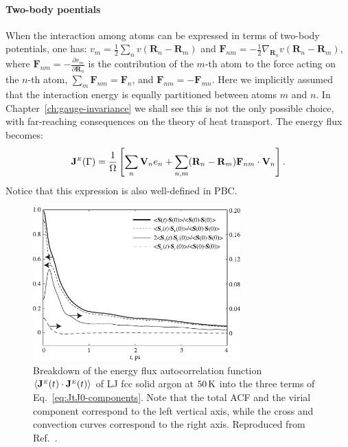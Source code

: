 \begin{LEtext}
\paragraph{Two-body poentials}
When the interaction among atoms can be expressed in terms of two-body potentials, one has: $v_m=\frac{1}{2}\sum_n v(\mathbf{R}_n- \mathbf{R}_m)$ and $\mathbf{F}_{n m} = - \frac{1}{2} \nabla_{\mathbf{R}_n} v(\mathbf{R}_n- \mathbf{R}_m)$, where $\mathbf{F}_{n m} = - \frac{\partial v_m}{\partial \mathbf{R}_n}$ is the contribution of the $m$-th atom to the force acting on the $n$-th atom, $\sum_m \mathbf{F}_{n m} = \mathbf{F}_{n}$, and $\mathbf{F}_{n m} = -\mathbf{F}_{m n}$. 
Here we implicitly assumed that the interaction energy is equally partitioned between atoms $m$ and $n$. In Chapter~\ref{ch:gauge-invariance} we shall see this is not the only possible choice, with far-reaching consequences on the theory of heat transport.
The energy flux becomes:
\begin{equation}
    \mathbf{J}^\smallE(\rGamma) =
       \frac{1}{\rOmega} \left[ \sum_n \mathbf{V}_n e_n + \sum_{n,m} (\mathbf{R}_n-\mathbf{R}_m) \mathbf{F}_{n m} \cdot \mathbf{V}_n \right]. \label{eq:J-classical-2body}
\end{equation}
Notice that this expression is also well-defined in PBC.

\begin{figure}[tb]
    \centering
    \includegraphics[width=8cm]{chapters/chapter2/figures/McGaughey-argon-contributions.pdf}
    \caption{Breakdown of the energy flux autocorrelation function $\langle\mathbf{J}^{\scriptscriptstyle E}(t)\cdot\mathbf{J}^{\scriptscriptstyle E}(t)\rangle$ of LJ fcc solid argon at $50\,\mathrm{K}$ into the three terms of Eq.~\eqref{eq:JtJ0-components}. Note that the total ACF and the virial component correspond to the left vertical axis, while the cross and convection curves correspond to the right axis. Reproduced from Ref.~\cite{McGaughey2006}.}
    \label{fig:argon-convective}
\end{figure}


\end{LEtext}

